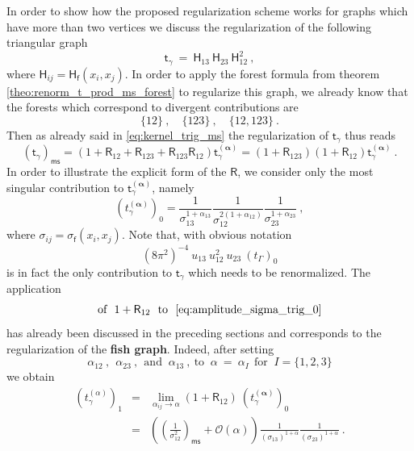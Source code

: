 \documentclass[11pt]{book}
\newcommand{\ms}{\mathsf{ms}}
\newcommand{\alphabd}{\boldsymbol{\alpha}}
\newcommand{\Ocal}{\mathcal{O}}
\newcommand{\Hsf}{\mathsf{H}}
\newcommand{\Rsf}{\mathsf{R}}
\newcommand{\fsf}{\mathsf{f}}
\newcommand{\tsf}{\mathsf{t}}
\theoremstyle{break}
\begin{document}
In order to show how the proposed regularization scheme works for graphs which have more than two vertices we discuss the regularization of the following triangular graph
%
\begin{equation*}
\tsf_\gamma \ = \ \Hsf_{13} \ \Hsf_{23} \ \Hsf_{12}^2 \ , 
\end{equation*}
%
where $\Hsf_{ij} = \Hsf_\fsf(x_i,x_j)$. In order to apply the forest formula from theorem \ref{theo:renorm_t_prod_ms_forest} to regularize this graph, we already know that the forests which correspond to divergent contributions are 
%
\begin{equation*}
\{12\} \ , \quad \{123\} \ , \quad \{12,123\} \ .
\end{equation*} 
%
Then as already said in \eqref{eq:kernel_trig_ms} the regularization of $\tsf_\gamma$ thus reads
%
\begin{equation*}
\left(\tsf_\gamma\right)_\ms = \left(1+\Rsf_{12}+\Rsf_{123}+\Rsf_{123}\Rsf_{12}\right) \tsf^{(\alphabd)}_\gamma = (1+\Rsf_{123})(1+\Rsf_{12}) \tsf^{(\alphabd)}_\gamma \ .
\end{equation*}
%
In order to illustrate the explicit form of the $\Rsf$, we consider only the most singular contribution to $\tsf^{(\alphabd)}_\gamma$, namely
%
\begin{equation}
\left(t_{\gamma}^{(\alphabd)}\right)_0 = \frac{1}{\sigma_{13}^{1+\alpha_{13}}} \frac{1}{\sigma_{12}^{2(1+\alpha_{12})}} \frac{1}{\sigma_{23}^{1+\alpha_{23}}} \ ,
\label{eq:amplitude_sigma_trig_0}
\end{equation}
%
where $\sigma_{ij} = \sigma_\fsf(x_i,x_j)$. Note that, with obvious notation
%
\begin{equation*}
(8\pi^2)^{-4} \ u_{13} \ u^2_{12} \ u_{23} \ \left(t_{\Gamma}\right)_0 
\end{equation*}
%
is in fact the only contribution to $\tsf_\gamma$ which needs to be renormalized. The application  
%
\begin{equation*}
\mbox{of } \ 1 + \Rsf_{12} \ \mbox{ to } \ \eqref{eq:amplitude_sigma_trig_0}
\end{equation*}
% 
has already been discussed in the preceding sections and corresponds to the regularization of the \textbf{fish graph}. Indeed, after setting 
%
\begin{equation*}
\alpha_{12} \ , \ \ \alpha_{23} \ , \ \ \mbox{and } \ \alpha_{13} \ , \ \mbox{to } \ \alpha \ = \ \alpha_I \ \ \mbox{for } \ I=\{1,2,3\} 
\end{equation*}
%
we obtain
%
\begin{eqnarray}
\left(t_{\gamma}^{(\alpha)}\right)_1 &=& \lim_{\alpha_{ij}\to\alpha} (1+\Rsf_{12}) \ \left(t_{\gamma}^{(\alphabd)}\right)_0 \nonumber \\
&=& \left(\left(\frac{1}{\sigma_{12}^2}\right)_\ms + \Ocal(\alpha)\right) \frac{1}{(\sigma_{13})^{1+\alpha}} \frac{1}{(\sigma_{23})^{1+\alpha}} \ .
\label{eq:amplitude_sigma_trig_1}
\end{eqnarray}
\end{document}
